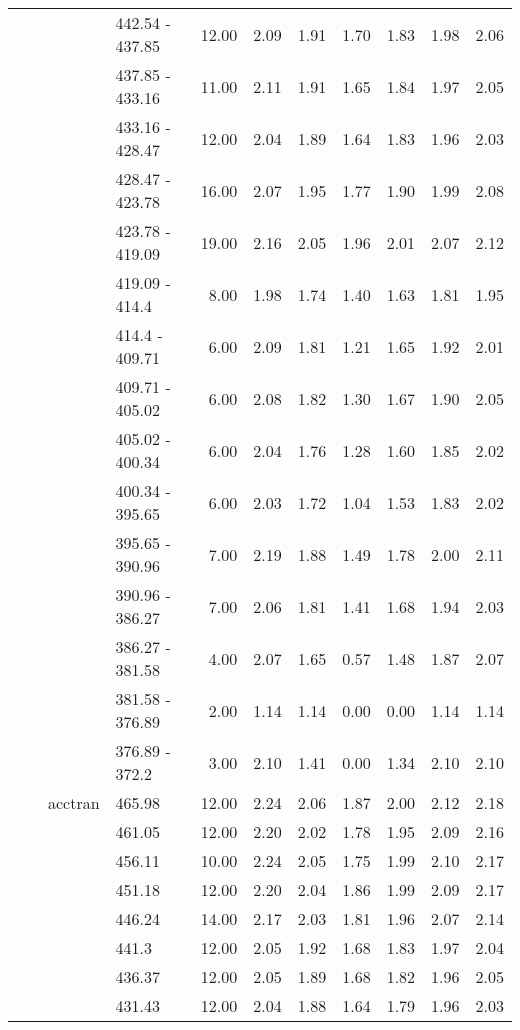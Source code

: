\begin{longtable}{llllrrrrrrr}
   &  &  & 442.54 - 437.85 & 12.00 & 2.09 & 1.91 & 1.70 & 1.83 & 1.98 & 2.06 \\ 
   &  &  & 437.85 - 433.16 & 11.00 & 2.11 & 1.91 & 1.65 & 1.84 & 1.97 & 2.05 \\ 
   &  &  & 433.16 - 428.47 & 12.00 & 2.04 & 1.89 & 1.64 & 1.83 & 1.96 & 2.03 \\ 
   &  &  & 428.47 - 423.78 & 16.00 & 2.07 & 1.95 & 1.77 & 1.90 & 1.99 & 2.08 \\ 
   &  &  & 423.78 - 419.09 & 19.00 & 2.16 & 2.05 & 1.96 & 2.01 & 2.07 & 2.12 \\ 
   &  &  & 419.09 - 414.4 & 8.00 & 1.98 & 1.74 & 1.40 & 1.63 & 1.81 & 1.95 \\ 
   &  &  & 414.4 - 409.71 & 6.00 & 2.09 & 1.81 & 1.21 & 1.65 & 1.92 & 2.01 \\ 
   &  &  & 409.71 - 405.02 & 6.00 & 2.08 & 1.82 & 1.30 & 1.67 & 1.90 & 2.05 \\ 
   &  &  & 405.02 - 400.34 & 6.00 & 2.04 & 1.76 & 1.28 & 1.60 & 1.85 & 2.02 \\ 
   &  &  & 400.34 - 395.65 & 6.00 & 2.03 & 1.72 & 1.04 & 1.53 & 1.83 & 2.02 \\ 
   &  &  & 395.65 - 390.96 & 7.00 & 2.19 & 1.88 & 1.49 & 1.78 & 2.00 & 2.11 \\ 
   &  &  & 390.96 - 386.27 & 7.00 & 2.06 & 1.81 & 1.41 & 1.68 & 1.94 & 2.03 \\ 
   &  &  & 386.27 - 381.58 & 4.00 & 2.07 & 1.65 & 0.57 & 1.48 & 1.87 & 2.07 \\ 
   &  &  & 381.58 - 376.89 & 2.00 & 1.14 & 1.14 & 0.00 & 0.00 & 1.14 & 1.14 \\ 
   &  &  & 376.89 - 372.2 & 3.00 & 2.10 & 1.41 & 0.00 & 1.34 & 2.10 & 2.10 \\ 
   &  & acctran & 465.98 & 12.00 & 2.24 & 2.06 & 1.87 & 2.00 & 2.12 & 2.18 \\ 
   &  &  & 461.05 & 12.00 & 2.20 & 2.02 & 1.78 & 1.95 & 2.09 & 2.16 \\ 
   &  &  & 456.11 & 10.00 & 2.24 & 2.05 & 1.75 & 1.99 & 2.10 & 2.17 \\ 
   &  &  & 451.18 & 12.00 & 2.20 & 2.04 & 1.86 & 1.99 & 2.09 & 2.17 \\ 
   &  &  & 446.24 & 14.00 & 2.17 & 2.03 & 1.81 & 1.96 & 2.07 & 2.14 \\ 
   &  &  & 441.3 & 12.00 & 2.05 & 1.92 & 1.68 & 1.83 & 1.97 & 2.04 \\ 
   &  &  & 436.37 & 12.00 & 2.05 & 1.89 & 1.68 & 1.82 & 1.96 & 2.05 \\ 
   &  &  & 431.43 & 12.00 & 2.04 & 1.88 & 1.64 & 1.79 & 1.96 & 2.03 \\ 

\end{longtable}
